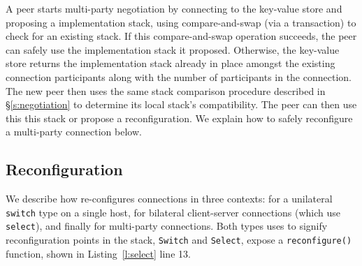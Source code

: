 A peer starts multi-party negotiation by connecting to the key-value store and proposing a \tunnel implementation stack, using compare-and-swap (\eg via a transaction) to check for an existing stack.
If this compare-and-swap operation succeeds, the peer can safely use the \tunnel implementation stack it proposed. 
Otherwise, the key-value store returns the \tunnel implementation stack already in place amongst the existing connection participants along with the number of participants in the connection.
The new peer then uses the same stack comparison procedure described in \S\ref{s:negotiation} to determine its local stack's compatibility.
The peer can then use this this stack or propose a reconfiguration. We explain how to safely reconfigure a multi-party connection below.

\subsection{Reconfiguration }\label{s:impl-reconfig}
\begin{outline}
\1 We describe how \name re-configures connections in three contexts: for a unilateral \texttt{switch} type on a single host, for bilateral client-server connections (which use \texttt{select}), and finally for multi-party connections.
\1 Both types \name uses to signify reconfiguration points in the \tunnel stack, \texttt{Switch} and \texttt{Select}, expose a \texttt{reconfigure()} function, shown in Listing~\ref{l:select} line 13.
\end{outline}


